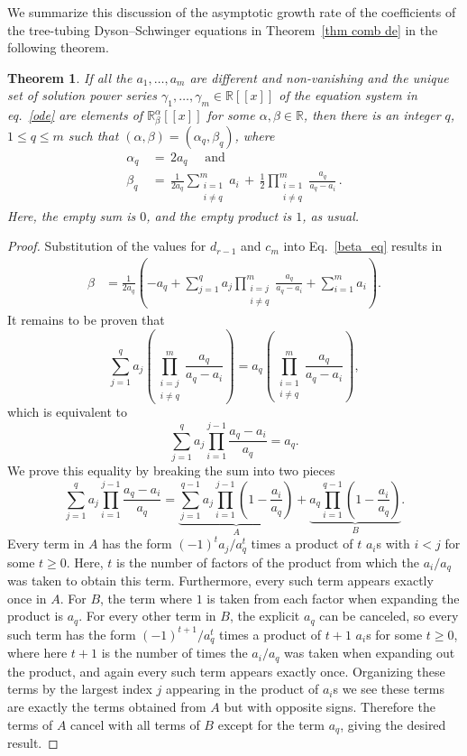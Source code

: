 \documentclass[oneside]{amsart}
\newtheorem{thm}{Theorem}[section]
\theoremstyle{definition}
\newcommand{\R}{{\mathbb{R}}}
\begin{document}
We summarize this discussion of the asymptotic growth rate of the coefficients of the tree-tubing Dyson--Schwinger equations in 
Theorem~\ref{thm comb de} in the following theorem.
\begin{thm}
\label{thm fixed alpha beta}
If all the $a_1,\ldots,a_m$ are different and non-vanishing and the unique set of solution power series $\gamma_1,\ldots,\gamma_m \in \R[[x]]$ of the equation system in eq.~\eqref{ode} are elements of $\R^\alpha_\beta[[x]]$ for some $\alpha,\beta \in \R$, then there is an integer $q$, $1 \leq q \leq m$ such that $(\alpha,\beta) = (\alpha_q,\beta_q)$, where 
\begin{align} \label{eq:alphas} \alpha_q &\,=\, 2 a_q \quad\text{ and }\\
\label{eq:betas} \beta_q &\,=\, \frac{1}{2 a_q}\sum_{\substack{i=1\\ i\neq q}}^m a_i \,+\, \frac12 \prod_{\substack{i=1\\ i\neq q}}^{m}\frac{a_q}{a_q-a_i}\,. \end{align}
Here, the empty sum is $0$, and the empty product is $1$, as usual.
\end{thm}
\begin{proof}
Substitution of the values for $d_{r-1}$ and $c_m$ 
into Eq.~\eqref{beta_eq}  results in 
\begin{align*} \beta &= \frac{1}{2 a_q} \left( -a_q + \sum_{j=1}^q a_j \prod_{\substack{i=j\\ i\neq q}}^{m} \frac{a_q}{a_q-a_i} + \sum_{i=1}^m a_i \right). \end{align*}
It remains to be proven that 
\[
     \sum_{j=1}^q a_j \left( \prod_{\substack{i=j\\ i\neq q}}^{m}\frac{a_q}{a_q-a_i} \right) = a_q \left( \prod_{\substack{i=1\\ i\neq q}}^{m}\frac{a_q}{a_q-a_i} \right),
\]
which is equivalent to 
    \[
    \sum_{j=1}^q a_j \prod_{i=1}^{j-1}\frac{a_q-a_i}{a_q} = a_q.
    \]
We prove this equality by breaking the sum into two pieces
    \[
    \sum_{j=1}^q a_j \prod_{i=1}^{j-1}\frac{a_q-a_i}{a_q} = \underbrace{\sum_{j=1}^{q-1} a_j \prod_{i=1}^{j-1}\left(1 - \frac{a_i}{a_q}\right)}_A + \underbrace{a_q \prod_{i=1}^{q-1}\left(1 - \frac{a_i}{a_q}\right)}_B.
    \]
    Every term in $A$ has the form $(-1)^ta_j/a_q^t$ times a product of $t$ $a_i$s with $i<j$ for some $t\geq 0$. Here, $t$ is the number of factors of the product from which the $a_i/a_q$ was taken to obtain this term.  Furthermore, every such term appears exactly once in $A$.  For $B$, the term where $1$ is taken from each factor when expanding the product is $a_q$.  For every other term in $B$, the explicit $a_q$ can be canceled, so every such term has the form $(-1)^{t+1}/a_q^t$ times a product of $t+1$ $a_i$s for some $t\geq 0$, where here $t+1$ is the number of times the $a_i/a_q$ was taken when expanding out the product, and again every such term appears exactly once. Organizing these terms by the largest index $j$ appearing in the product of $a_i$s we see these terms are exactly the terms obtained from $A$ but with opposite signs.  Therefore the terms of $A$ cancel with all terms of $B$ except for the term $a_q$, giving the desired result.
\end{proof}
\end{document}

